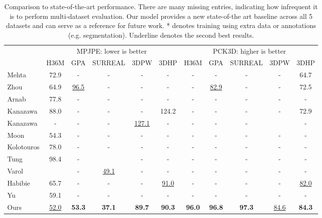 \documentclass[runningheads]{llncs}
\begin{document}
\begin{table}[!t]
\centering
{\scriptsize
\begin{tabular}{@{}l c c c c c|c c c c c@{}}
\Xhline{2\arrayrulewidth}
\toprule
 &\multicolumn{5}{c}{MPJPE: lower is better} & \multicolumn{5}{c}{PCK3D: higher is better} \\
& H36M & GPA & SURREAL & 3DPW & 3DHP & H36M & GPA & SURREAL & 3DPW & 3DHP\\
\hline
Mehta \cite{mono_3dhp2017} & 72.9 & - & - & - & -                
& - & - & - & - & 64.7  \\
Zhou \cite{Zhou_2017_ICCV} & 64.9 & \underline{96.5} & - & - & - 
& - & \underline{82.9} & - & - & 72.5   \\
Arnab\cite{temporalinthewild} & 77.8 & - & - & - & -             
& - & - & - & - & -   \\
Kanazawa \cite{HMR} & 88.0 & - & - & - & 124.2                   
& - & - & - & - & 72.9   \\
Kanazawa \cite{HMMR} & - & - & - & \underline{127.1} & -         
& - & - & - &  & - \\
Moon \cite{rootnet} & 54.3 & - & - & - & -                       
& - & - & - & - & -    \\
Kolotouros \cite{GraphCMR}  & 78.0 & - & - & - & -               
& - & - & - & - & -   \\
Tung\cite{selfmocap} &  98.4 &  -&  &  -& - 
& - & - & - & - & -   \\
Varol\cite{bodynet} &  & - & \underline{49.1} & - & -   
& - & - & - & - & -   \\
Habibie \cite{inthewildintermediate} & 65.7 & - & - & - & \underline{91.0}  
& - & - & - & - & \underline{82.0}  \\
Yu \cite{skeletonrepresentation} & 59.1 &  - & - & - & -         
& - & - & - & - & -   \\
Ours & \underline{52.0} & \textbf{53.3} & \textbf{37.1} & \textbf{89.7} & \textbf{90.3}
& \textbf{96.0} & \textbf{96.8} &  \textbf{97.3} &  \underline{84.6} & \textbf{84.3} \\
\bottomrule
\end{tabular}
}
\caption{Comparison to state-of-the-art performance. 
There are many missing entries, indicating how infrequent it is to perform
multi-dataset evaluation.  Our model provides a new state-of-the art baseline
across all 5 datasets and can serve as a reference for future work.
* denotes training using extra data or annotations (e.g. segmentation). 
Underline denotes the second best results.
}
\label{table:stateofart}
\end{table}
\end{document}
